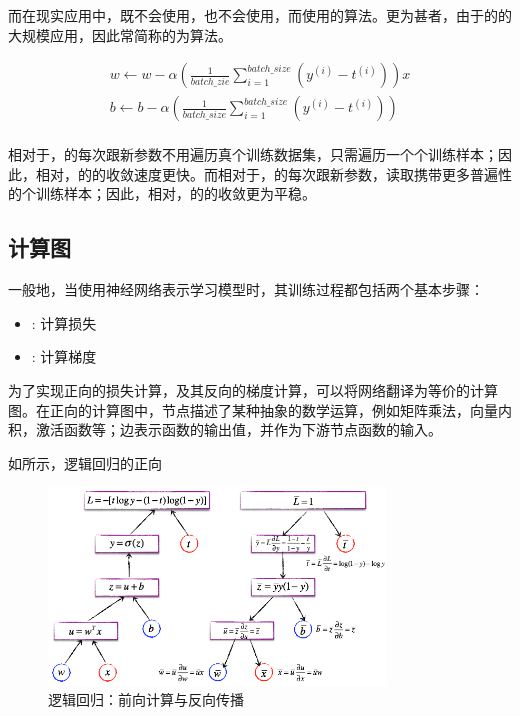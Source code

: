 \begin{content}
而在现实应用中，既不会使用，也不会使用，而使用的算法。更为甚者，由于的的大规模应用，因此常简称的为算法。

\[\begin{aligned}
  w \leftarrow w - \alpha \left( {\frac{1}{{batch\_zie}}\sum\limits_{i = 1}^{batch\_size} {\left( {{y^{(i)}} - {t^{(i)}}} \right)} } \right)x \\ 
  b \leftarrow b - \alpha \left( {\frac{1}{{batch\_size}}\sum\limits_{i = 1}^{batch\_size} {\left( {{y^{(i)}} - {t^{(i)}}} \right)} } \right) \\ 
\end{aligned} \]

相对于，的每次跟新参数不用遍历真个训练数据集，只需遍历一个个训练样本；因此，相对，的的收敛速度更快。而相对于，的每次跟新参数，读取携带更多普遍性的个训练样本；因此，相对，的的收敛更为平稳。

\subsection{计算图}

一般地，当使用神经网络表示学习模型时，其训练过程都包括两个基本步骤：

\begin{itemize}
  \item {}: 计算损失
  \item {}: 计算梯度
\end{itemize}

为了实现正向的损失计算，及其反向的梯度计算，可以将网络翻译为等价的计算图。在正向的计算图中，节点描述了某种抽象的数学运算，例如矩阵乘法，向量内积，激活函数等；边表示函数的输出值，并作为下游节点函数的输入。



如所示，逻辑回归的正向

\begin{figure}[H]
\centering
\includegraphics[width=0.8\textwidth]{figures/logistic-bp.png}
\caption{逻辑回归：前向计算与反向传播}
 \label{fig:logistic-bp}
\end{figure}


\end{content}

